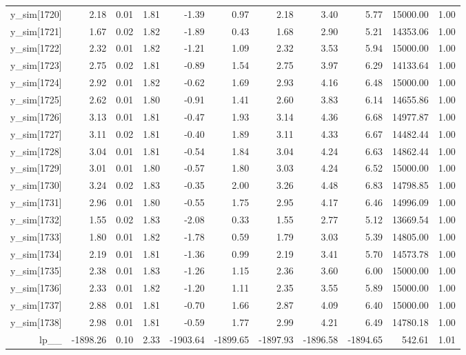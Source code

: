 \begin{table}[ht]
\begin{tabular}{rrrrrrrrrrr}
  y\_sim[1720] & 2.18 & 0.01 & 1.81 & -1.39 & 0.97 & 2.18 & 3.40 & 5.77 & 15000.00 & 1.00 \\ 
  y\_sim[1721] & 1.67 & 0.02 & 1.82 & -1.89 & 0.43 & 1.68 & 2.90 & 5.21 & 14353.06 & 1.00 \\ 
  y\_sim[1722] & 2.32 & 0.01 & 1.82 & -1.21 & 1.09 & 2.32 & 3.53 & 5.94 & 15000.00 & 1.00 \\ 
  y\_sim[1723] & 2.75 & 0.02 & 1.81 & -0.89 & 1.54 & 2.75 & 3.97 & 6.29 & 14133.64 & 1.00 \\ 
  y\_sim[1724] & 2.92 & 0.01 & 1.82 & -0.62 & 1.69 & 2.93 & 4.16 & 6.48 & 15000.00 & 1.00 \\ 
  y\_sim[1725] & 2.62 & 0.01 & 1.80 & -0.91 & 1.41 & 2.60 & 3.83 & 6.14 & 14655.86 & 1.00 \\ 
  y\_sim[1726] & 3.13 & 0.01 & 1.81 & -0.47 & 1.93 & 3.14 & 4.36 & 6.68 & 14977.87 & 1.00 \\ 
  y\_sim[1727] & 3.11 & 0.02 & 1.81 & -0.40 & 1.89 & 3.11 & 4.33 & 6.67 & 14482.44 & 1.00 \\ 
  y\_sim[1728] & 3.04 & 0.01 & 1.81 & -0.54 & 1.84 & 3.04 & 4.24 & 6.63 & 14862.44 & 1.00 \\ 
  y\_sim[1729] & 3.01 & 0.01 & 1.80 & -0.57 & 1.80 & 3.03 & 4.24 & 6.52 & 15000.00 & 1.00 \\ 
  y\_sim[1730] & 3.24 & 0.02 & 1.83 & -0.35 & 2.00 & 3.26 & 4.48 & 6.83 & 14798.85 & 1.00 \\ 
  y\_sim[1731] & 2.96 & 0.01 & 1.80 & -0.55 & 1.75 & 2.95 & 4.17 & 6.46 & 14996.09 & 1.00 \\ 
  y\_sim[1732] & 1.55 & 0.02 & 1.83 & -2.08 & 0.33 & 1.55 & 2.77 & 5.12 & 13669.54 & 1.00 \\ 
  y\_sim[1733] & 1.80 & 0.01 & 1.82 & -1.78 & 0.59 & 1.79 & 3.03 & 5.39 & 14805.00 & 1.00 \\ 
  y\_sim[1734] & 2.19 & 0.01 & 1.81 & -1.36 & 0.99 & 2.19 & 3.41 & 5.70 & 14573.78 & 1.00 \\ 
  y\_sim[1735] & 2.38 & 0.01 & 1.83 & -1.26 & 1.15 & 2.36 & 3.60 & 6.00 & 15000.00 & 1.00 \\ 
  y\_sim[1736] & 2.33 & 0.01 & 1.82 & -1.20 & 1.11 & 2.35 & 3.55 & 5.89 & 15000.00 & 1.00 \\ 
  y\_sim[1737] & 2.88 & 0.01 & 1.81 & -0.70 & 1.66 & 2.87 & 4.09 & 6.40 & 15000.00 & 1.00 \\ 
  y\_sim[1738] & 2.98 & 0.01 & 1.81 & -0.59 & 1.77 & 2.99 & 4.21 & 6.49 & 14780.18 & 1.00 \\ 
  lp\_\_ & -1898.26 & 0.10 & 2.33 & -1903.64 & -1899.65 & -1897.93 & -1896.58 & -1894.65 & 542.61 & 1.01 \\ 
   \hline
\end{tabular}
\end{table}
